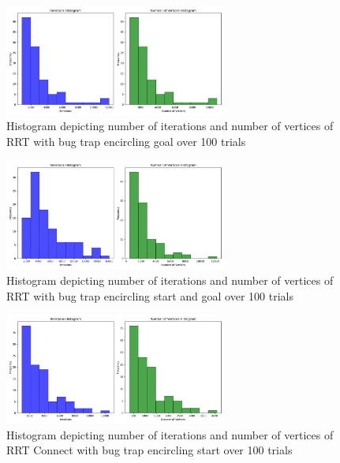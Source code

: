 \documentclass{article}
\begin{document}
\begin{figure}[H]
    \begin{center}
        \includegraphics[width=0.65\textwidth]{figures/hist_RRT_4.png}
    \end{center}
    \caption{Histogram depicting number of iterations and number of
    vertices of RRT with bug trap encircling goal over 100
trials}\label{fig:hist_RRT_4}
\end{figure}
\begin{figure}[H]
    \begin{center}
        \includegraphics[width=0.65\textwidth]{figures/hist_RRT_5.png}
    \end{center}
    \caption{Histogram depicting number of iterations and number of
    vertices of RRT with bug trap encircling start and goal over 100
trials}\label{fig:hist_RRT_5}
\end{figure}
\begin{figure}[H]
    \begin{center}
        \includegraphics[width=0.65\textwidth]{figures/hist_RRT_Connect_3.png}
    \end{center}
    \caption{Histogram depicting number of iterations and number of
    vertices of RRT Connect with bug trap encircling start over 100
trials}\label{fig:hist_RRT_Connect_3}
\end{figure}
\end{document}

